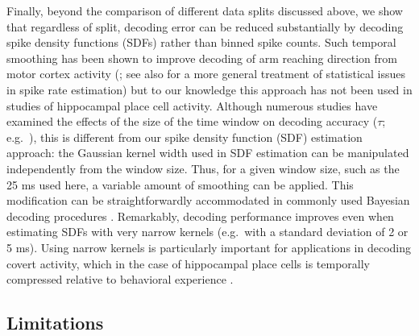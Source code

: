 \documentclass[11pt]{article}
\let\cite=\citep
\let\citeNP=\citealt
\begin{document}
Finally, beyond the comparison of different data splits discussed
above, we show that regardless of split, decoding error can be reduced
substantially by decoding spike density functions (SDFs) rather than
binned spike counts. Such temporal smoothing has been shown to improve
decoding of arm reaching direction from motor cortex activity
(\citeNP{Cunningham2009a}; see also
\citeNP{Kass2003,Shimazaki2010,Prerau2011} for a more general
treatment of statistical issues in spike rate estimation) but to our
knowledge this approach has not been used in studies of hippocampal
place cell activity. Although numerous studies have examined the
effects of the size of the time window on decoding accuracy ($\tau$;
e.g.\ \citeNP{Wilson1993,Zhang1998,Resnik2012,Chen2016a}), this is
different from our spike density function (SDF) estimation approach:
the Gaussian kernel width used in SDF estimation can be manipulated
independently from the window size. Thus, for a given window size,
such as the 25 ms used here, a variable amount of smoothing can be
applied. This modification can be straightforwardly accommodated in
commonly used Bayesian decoding procedures
\cite{Zhang1998}. Remarkably, decoding performance improves even when
estimating SDFs with very narrow kernels (e.g.\ with a standard
deviation of 2 or 5 ms). {\color{red} Using narrow kernels} is
particularly important for applications in decoding covert activity,
which in the case of hippocampal place cells is temporally compressed
relative to behavioral experience
\cite{Nadasdy1999,Lee2002,Dragoi2006,Buzsaki2015a}.

\subsection*{Limitations}
\end{document}
